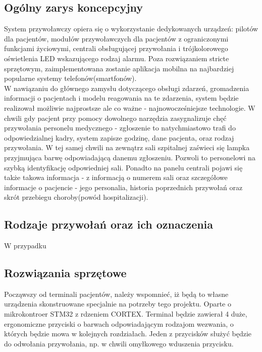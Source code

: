 \documentclass[12pt]{article} %
\begin{document}
\subsection{Ogólny zarys koncepcyjny}
System przywoławczy opiera się o wykorzystanie dedykowanych urządzeń: pilotów dla pacjentów, modułów przywoławczych dla pacjentów z ograniczonymi funkcjami życiowymi, centrali obsługującej przywołania i trójkolorowego oświetlenia LED wskazującego rodzaj alarmu. Poza rozwiązaniem stricte sprzętowym, zaimplementowana zostanie aplikacja mobilna na najbardziej popularne systemy telefonów(smartfonów).
\\
W nawiązaniu do głównego zamysłu dotyczącego obsługi zdarzeń, gromadzenia informacji o pacjentach i modelu reagowania na te zdarzenia, system będzie realizował możliwie najprostsze ale co ważne - najnowocześniejsze technologie. W chwili gdy pacjent przy pomocy dowolnego narzędzia zasygnalizuje chęć przywołania personelu medycznego - zgłoszenie to natychmiastowo trafi do odpowiedzialnej kadry, system zapisze godzinę, dane pacjenta, oraz rodzaj przywołania. W tej samej chwili na zewnątrz sali szpitalnej zaświeci się lampka przyjmująca barwę odpowiadającą danemu zgłoszeniu. Pozwoli to personelowi na szybką identyfikację odpowiedniej sali. Ponadto na panelu centrali pojawi się także takowa informacja  - z informacją o numerem sali oraz szczegółowe informacje o pacjencie - jego personalia, historia poprzednich przywołań oraz skrót przebiegu choroby(powód hospitalizacji).

\subsection{Rodzaje przywołań oraz ich oznaczenia}

W przypadku 

\subsection{Rozwiązania sprzętowe}

Począwszy od terminali pacjentów, należy wspomnieć, iż będą to własne urządzenia skonstruowane specjalnie na potrzeby tego projektu. Oparte o mikrokontroer STM32 z rdzeniem CORTEX. Terminal będzie zawierał 4 duże, ergonomiczne przyciski o barwach odpowiadającym rodzajom wezwania, o których będzie mowa w kolejnych rozdziałach. Jeden z przycisków służyć będzie do odwołania przywołania, np. w chwili omyłkowego wduszenia przycisku. 


\end{document}
